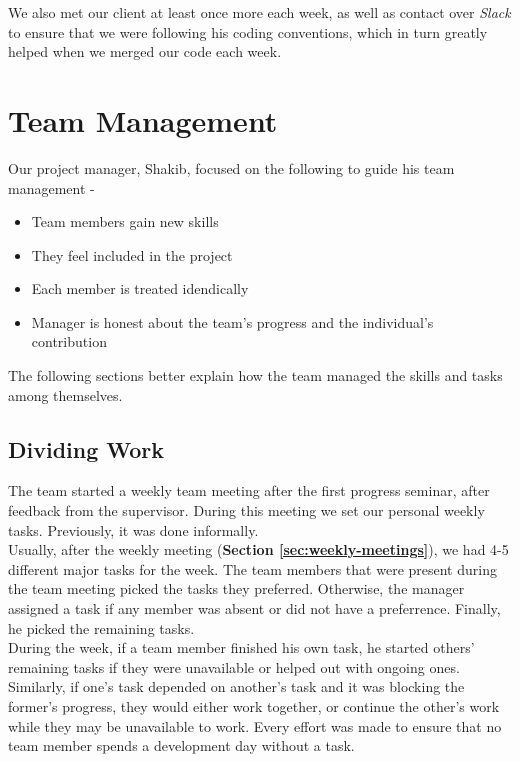 We also met our client at least once more each week, as well as contact over \textit{Slack} to ensure that we were following his coding conventions, which in turn greatly helped when we merged our code each week.

\section{Team Management}
\label{sec:people-management}
Our project manager, Shakib, focused on the following to guide his team management \cite{iansommerville2011}-

\begin{itemize}

  \item Team members gain new skills
  \item They feel included in the project
  \item Each member is treated idendically
  \item Manager is honest about the team's progress and the individual's contribution

\end{itemize}

The following sections better explain how the team managed the skills and tasks among themselves.

\subsection{Dividing Work}
\label{subsec:dividing-work}
The team started a weekly team meeting after the first progress seminar, after feedback from the supervisor. During this meeting we set our personal weekly tasks. Previously, it was done informally.\\

Usually, after the weekly meeting (\textbf{Section \ref{sec:weekly-meetings}}), we had 4-5 different major tasks for the week. The team members that were present during the team meeting picked the tasks they preferred. Otherwise, the manager assigned a task if any member was absent or did not have a preferrence. Finally, he picked the remaining tasks.\\

During the week, if a team member finished his own task, he started others' remaining tasks if they were unavailable or helped out with ongoing ones. Similarly, if one's task depended on another's task and it was blocking the former's progress, they would either work together, or continue the other's work while they may be unavailable to work. Every effort was made to ensure that no team member spends a development day without a task.\\

